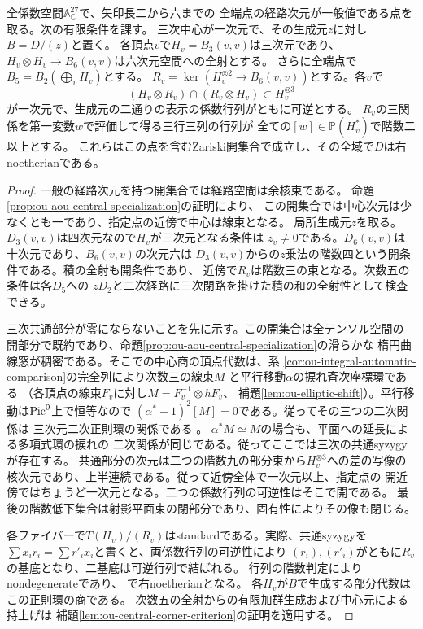 \begin{lemma}[三生成元二次正則環による頂点被覆の開条件]
\label{lem:ou-atv-open-corners}
全係数空間$\mathbb A^{27}_{\mathbb C}$で、矢印長二から六までの
全端点の経路次元が一般値である点を取る。次の有限条件を課す。
三次中心が一次元で、その生成元$z$に対し$B=D/(z)$と置く。
各頂点$v$で$H_v=B_3(v,v)$は三次元であり、
$H_v\otimes H_v\to B_6(v,v)$は六次元空間への全射とする。
さらに全端点で$B_5=B_2(\bigoplus_v H_v)$とする。
$R_v=\ker(H_v^{\otimes2}\to B_6(v,v))$とする。各$v$で
\[
 (H_v\otimes R_v)\cap(R_v\otimes H_v)\subset H_v^{\otimes3}
\]
が一次元で、生成元の二通りの表示の係数行列がともに可逆とする。
$R_v$の三関係を第一変数$w$で評価して得る三行三列の行列が
全ての$[w]\in\mathbb P(H_v^*)$で階数二以上とする。
これらはこの点を含むZariski開集合で成立し、その全域で$D$は右noetherianである。
\end{lemma}
\begin{proof}
一般の経路次元を持つ開集合では経路空間は余核束である。
命題\ref{prop:ou-aou-central-specialization}の証明により、
この開集合では中心次元は少なくとも一であり、指定点の近傍で中心は線束となる。
局所生成元$z$を取る。$D_3(v,v)$は四次元なので$H_v$が三次元となる条件は
$z_v\ne0$である。$D_6(v,v)$は十次元であり、$B_6(v,v)$の次元六は
$D_3(v,v)$からの$z$乗法の階数四という開条件である。積の全射も開条件であり、
近傍で$R_v$は階数三の束となる。次数五の条件は各$D_5$への
$zD_2$と二次経路に三次閉路を掛けた積の和の全射性として検査できる。

三次共通部分が零にならないことを先に示す。この開集合は全テンソル空間の
開部分で既約であり、命題\ref{prop:ou-aou-central-specialization}の滑らかな
楕円曲線窓が稠密である。そこでの中心商の頂点代数は、系
\ref{cor:ou-integral-automatic-comparison}の完全列により次数三の線束$M$
と平行移動$\alpha$の捩れ斉次座標環である
（各頂点の線束$F_v$に対し$M=F_v^{-1}\otimes h F_v$、
補題\ref{lem:ou-elliptic-shift}）。平行移動は$\operatorname{Pic}^0$上で恒等なので
$(\alpha^*-1)^2[M]=0$である。従ってその三つの二次関係は
三次元二次正則環の関係である
\cite[Theorems~1--3, (6.8)]{ATV1990}。
$\alpha^*M\simeq M$の場合も、平面への延長による多項式環の捩れの
二次関係が同じである。従ってここでは三次の共通syzygyが存在する。
共通部分の次元は二つの階数九の部分束から$H_v^{\otimes3}$への差の写像の
核次元であり、上半連続である。従って近傍全体で一次元以上、指定点の
開近傍ではちょうど一次元となる。二つの係数行列の可逆性はそこで開である。
最後の階数低下集合は射影平面束の閉部分であり、固有性によりその像も閉じる。

各ファイバーで$T(H_v)/(R_v)$はstandardである。実際、共通syzygyを
$\sum x_i r_i=\sum r'_i x_i$と書くと、両係数行列の可逆性により
$(r_i),(r'_i)$がともに$R_v$の基底となり、二基底は可逆行列で結ばれる。
行列の階数判定によりnondegenerateであり、
\cite[Theorems~1, 8.1]{ATV1990}で右noetherianとなる。
各$H_v$が$B$で生成する部分代数はこの正則環の商である。
次数五の全射からの有限加群生成および中心元による持上げは
補題\ref{lem:ou-central-corner-criterion}の証明を適用する。
\end{proof}

